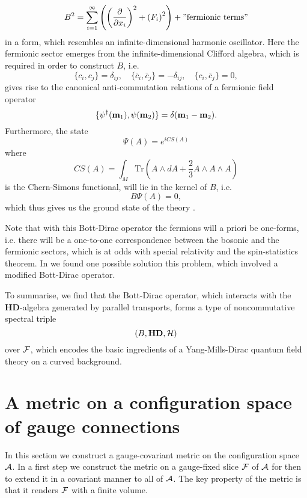 \documentclass[letterpaper,11pt]{article}
\def\d{\delta}
\def\ca{{\cal A}}
\def\cf{{\cal F}}
\def\ch{{\cal H}}
\newcommand{\pa}{\partial}
\begin{document}
$$
B^2 = \sum_{i=1}^\infty \left( \left(\frac{\pa}{\pa x_i}\right)^2 +  \left( F_i\right)^2 \right) + "\mbox{fermionic terms}"
$$
in a form, which resembles an infinite-dimensional harmonic oscillator. Here the fermionic sector emerges from the infinite-dimensional Clifford algebra, which is required in order to construct $B$, i.e.
$$
\{ c_i , {c}_j \} = \d_{ij},\quad \{ \bar{c}_i , \bar{c}_j \} = -\d_{ij},\quad \{ c_i , \bar{c}_j \} = 0,
$$
gives rise to the canonical anti-commutation relations of a fermionic field operator \cite{Aastrup:2020jcf}
$$
\{  {\psi}^\dagger({\bf m}_1) , {\psi}({\bf m}_2) \} = \d({\bf m}_1-{\bf m}_2).
$$
Furthermore, the state
$$
\Psi(A) = e^{i CS(A)}
$$
where
$$
CS(A) = \int_M \mbox{Tr} \left( A\wedge dA + \frac{2}{3} A\wedge A \wedge A \right)
$$
is the Chern-Simons functional, will lie in the kernel of $B$, i.e.
$$
B \Psi(A) =0,
$$
which thus gives us the ground state of the theory \cite{Aastrup:2020jcf}.



Note that with this Bott-Dirac operator the fermions will a priori be one-forms, i.e. there will be a one-to-one correspondence between the bosonic and the fermionic sectors, which is at odds with special relativity and the spin-statistics theorem. 
In \cite{Aastrup:2020jcf} we found one possible solution this problem, which involved a modified Bott-Dirac operator.
  





To summarise, we find that the Bott-Dirac operator, which interacts with the ${\mathbf{ HD}}$-algebra generated by parallel transports, forms a type of noncommutative spectral triple
$$
(B, {\mathbf{ HD}}, \ch )
$$
over $\cf$,
which encodes the basic ingredients of a Yang-Mills-Dirac quantum field theory on a curved background.











\section{A metric on a configuration space of gauge connections}

 In this section we construct a gauge-covariant metric on the configuration space $\ca$. In a first step we construct the metric on a gauge-fixed slice $\cf$ of $\ca$ for then to extend it in a covariant manner to all of $\ca$. %
 The key property of the metric is that it renders $\cf$ with a finite volume. \\
 
\end{document}
